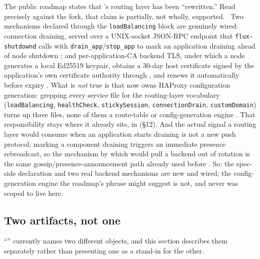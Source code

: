  The public roadmap states that 's routing layer
has been ``rewritten.'' Read precisely against the fork, that claim is partially, not wholly,
supported. \inprogress\ Two mechanisms declared through the \texttt{loadBalancing} block are
genuinely wired: connection draining, served over a UNIX-socket
JSON-RPC endpoint that \texttt{flux-shutdownd} calls with \texttt{drain\_app}\slash\texttt{stop\_app} to
mark an application draining ahead of node shutdown
;
and per-application-CA backend TLS, under which a node generates a local Ed25519 keypair, obtains a
30-day host certificate signed by the application's own certificate authority through \fluxbench,
and renews it automatically before expiry
.
What is \emph{not} true is that \FluxOS now owns HAProxy configuration generation: grepping every
service file for the routing-layer vocabulary (\texttt{loadBalancing}, \texttt{healthCheck},
\texttt{stickySession}, \texttt{connection\allowbreak{}Drain}, \texttt{customDomain}) turns up three files, none
of them a route-table or config-generation engine
.
That responsibility stays where it already sits, in \FDM (\S12). And the actual signal a routing
layer would consume when an application starts draining is not a new push protocol; marking a
component draining triggers an immediate presence rebroadcast, so the mechanism by which \FDM
would pull a backend out of rotation is the same gossip/presence-announcement path \FluxOS already
used before 
.
So: the spec-side declaration and two real backend mechanisms are new and wired; the config-generation
engine the roadmap's phrase might suggest is not, and never was scoped to live here.

\subsection{Two artifacts, not one}
\label{sec:two-artifacts}

``'' currently names two different objects, and this section describes them separately
rather than presenting one as a stand-in for the other.

